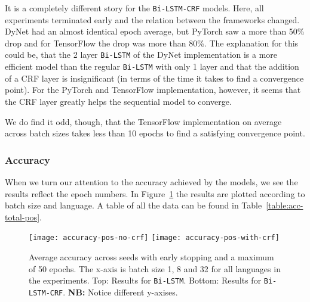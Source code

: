 It is a completely different story for the \texttt{Bi-LSTM-CRF} models. Here,
all experiments terminated early and the relation between the frameworks
changed.  DyNet had an almost identical epoch average, but PyTorch saw a more
than 50\% drop and for TensorFlow the drop was more than 80\%. The explanation
for this could be, that the 2 layer \texttt{Bi-LSTM} of the DyNet implementation
is a more efficient model than the regular \texttt{Bi-LSTM} with only 1 layer
and that the addition of a CRF layer is insignificant (in terms of the time it
takes to find a convergence point). For the PyTorch and TensorFlow
implementation, however, it seems that the CRF layer greatly helps the
sequential model to converge.

We do find it odd, though, that the TensorFlow implementation on average across
batch sizes takes less than 10 epochs to find a satisfying convergence point.

\subsubsection{Accuracy}

When we turn our attention to the accuracy achieved by the models, we see the
results reflect the epoch numbers. In
Figure~\ref{chart:acc-by-batch-and-lang-pos} the results are plotted
according to batch size and language. A table of all the data can be found in
Table~\ref{table:acc-total-pos}.

\begin{figure}[h!]
    \texttt{[image: accuracy-pos-no-crf]}
    \texttt{[image: accuracy-pos-with-crf]}
    \caption{Average accuracy across seeds with early stopping and a maximum of
        50 epochs. The x-axis is batch size 1, 8 and 32 for all languages in the
        experiments. Top: Results for \texttt{Bi-LSTM}. Bottom: Results for
    \texttt{Bi-LSTM-CRF}. \textbf{NB:} Notice different y-axises.
    }\label{chart:acc-by-batch-and-lang-pos}
\end{figure}

